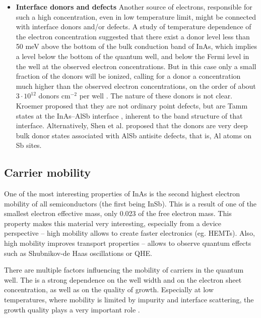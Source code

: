\documentclass[titlepage,a4paper]{book}
\begin{document}
\begin{itemize}
\item \textbf{Interface donors and defects} \newline
Another source of electrons, responsible for such a high concentration, even in low temperature limit, might be connected with interface donors and/or defects. A study of temperature dependence of the electron concentration suggested that there exist a donor level less than 50 meV above the bottom of the bulk conduction band of InAs, which implies a level below the bottom of the quantum well, and
below the Fermi level in the well at the observed electron concentrations. But in this case only a small fraction of the donors will be ionized, calling for a donor a concentration much higher than the observed electron concentrations, on the order of about $3 \cdot 10^{12}$ donors cm$^{-2}$ per well \cite{Kroemer_review}. The nature of these donors is not clear. Kroemer proposed that they are not ordinary point defects, but are Tamm states at the InAs–AlSb interface \cite{Kroemer_TammStates}, inherent to the band structure of that interface. Alternatively, Shen et al. \cite{Shen_TammStates} proposed that the donors are very deep bulk donor states associated with AlSb antisite defects, that is, Al atoms on Sb sites.
\end{itemize}

\subsection{Carrier mobility}
One of the most interesting properties of InAs is the second highest electron mobility of all semiconductors (the first being InSb). This is a result of one of the smallest electron effective mass, only 0.023 of the free electron mass. This property makes this material very interesting, especially from a device perspective -- high mobility allows to create faster electronics (eg. HEMTs). Also, high mobility improves transport properties -- allows to  observe quantum effects such as Shubnikov-de Haas oscillations or QHE.

There are multiple factors influencing the mobility of carriers in the quantum well. The is a strong dependence on the well width and on the electron sheet concentration, as well as on the quality of growth. Especially at low temperatures, where mobility is limited by impurity and interface scattering, the growth quality plays a very important role \cite{Nguyen_Mobility}.
\end{document}
